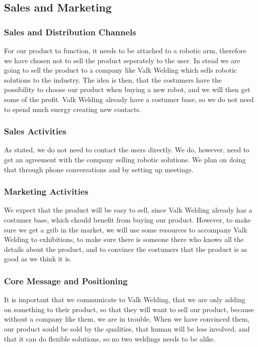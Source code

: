 \subsection{Sales and Marketing}
\subsubsection{Sales and Distribution Channels}
For our product to function, it needs to be attached to a robotic arm, therefore we have chosen not to sell the product seperately to the user. 
In stead we are going to sell the product to a company like Valk Welding which sells robotic solutions to the industry. 
The idea is then, that the costumers have the possibility to choose our product when buying a new robot, and we will then get some of the profit. 
Valk Welding already have a costumer base, so we do not need to spend much energy creating new contacts. 
\subsubsection{Sales Activities}
As stated, we do not need to contact the users directly. 
We do, however, need to get an agreement with the company selling robotic solutions. 
We plan on doing that through phone conversations and by setting up meetings. 
\subsubsection{Marketing Activities}
We expect that the product will be easy to sell, since Valk Welding already has a costumer base, which chould benefit from buying our product. 
However, to make sure we get a grib in the market, we will use some resources to accompany Valk Welding to exhibitions, to make sure there is someone there who knows all the details about the product, and to convince the costumers that the product is as good as we think it is. 
\subsubsection{Core Message and Positioning}
It is important that we communicate to Valk Welding, that we are only adding on something to their product, so that they will want to sell our product, because without a company like them, we are in trouble. 
When we have convinced them, our product sould be sold by the qualities, that human will be less involved, and that it can do flexible solutions, so no two weldings needs to be alike. 
